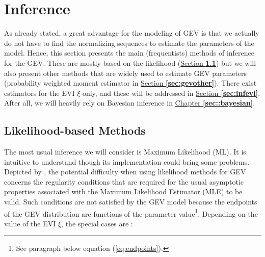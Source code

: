 \section{Inference}\label{sec::gevinfernce} 

As already stated, a great advantage for the modeling of GEV is that we actually do not have to find the normalizing sequences to estimate the parameters of the model. Hence, this section presents the main (frequentists) methods of inference for the GEV. These are mostly based on the likelihood (\hyperref[likgevintro]{Section\textbf{ \ref{likgevintro}}}) but we will also present other methods that are widely used to estimate GEV parameters (probability weighted moment estimator in \hyperref[sec:gevother]{Section \textbf{\ref{sec:gevother}}}). There exist estimators for the EVI $\xi$ only, and these will be addressed in \hyperref[sec:infevi]{Section \textbf{\ref{sec:infevi}}}. After all, we will heavily rely on Bayesian inference in \hyperref[sec::bayesian]{Chapter \textbf{\ref{sec::bayesian}}}.


\subsection{Likelihood-based Methods}\label{likgevintro}

The most usual inference we will consider is Maximum Likelihood (ML). It is intuitive to understand though its implementation could bring some problems.
Depicted by \citet{smith_maximum_1985-1}, the potential difficulty when using likelihood methods for GEV concerns the regularity conditions that are required for the usual asymptotic properties associated with the Maximum Likelihood Estimator (MLE) to be valid. Such conditions are not satisfied by the GEV
model because the endpoints of the GEV distribution are functions of the parameter value\footnote{See paragraph below equation (\ref{eq:endpoints}).}. Depending on the value of the EVI $\xi$, the special cases are :

